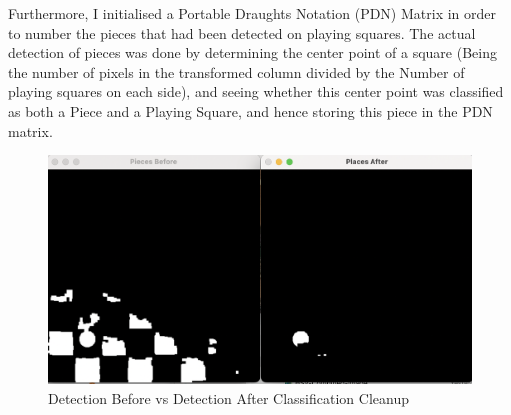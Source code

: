 \documentclass[12pt]{article}
\begin{document}
    \par
    Furthermore, I initialised a Portable Draughts Notation (PDN) Matrix in order to number the pieces that had been detected on playing squares. The actual detection of pieces was done by determining the center point of a square (Being the number of pixels in the transformed column
    divided by the Number of playing squares on each side), and seeing whether this center point was classified as both a Piece and a Playing Square, and hence storing this piece in the PDN matrix.   

    \newpage
    \begin{figure}
        \centering
        \includegraphics[scale = .3]{Bad-v-Good-piece-detection.png}
        \caption{Detection Before vs Detection After Classification Cleanup}
    \end{figure}
\end{document}
